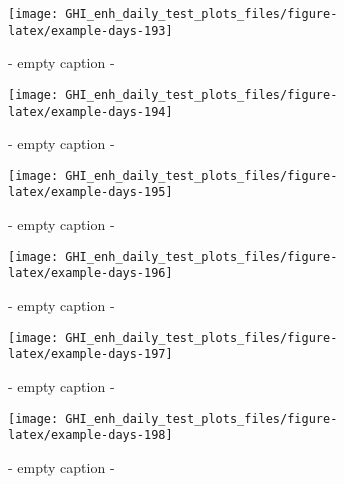 \documentclass[
  10pt,
  a4paper,oneside]{article}
\begin{document}
\begin{figure}[H]

{\centering \texttt{[image: GHI\_enh\_daily\_test\_plots\_files/figure-latex/example-days-193]} 

}

\caption{ - empty caption - }\label{fig:example-days-193}
\end{figure}

\begin{figure}[H]

{\centering \texttt{[image: GHI\_enh\_daily\_test\_plots\_files/figure-latex/example-days-194]} 

}

\caption{ - empty caption - }\label{fig:example-days-194}
\end{figure}

\begin{figure}[H]

{\centering \texttt{[image: GHI\_enh\_daily\_test\_plots\_files/figure-latex/example-days-195]} 

}

\caption{ - empty caption - }\label{fig:example-days-195}
\end{figure}

\begin{figure}[H]

{\centering \texttt{[image: GHI\_enh\_daily\_test\_plots\_files/figure-latex/example-days-196]} 

}

\caption{ - empty caption - }\label{fig:example-days-196}
\end{figure}

\begin{figure}[H]

{\centering \texttt{[image: GHI\_enh\_daily\_test\_plots\_files/figure-latex/example-days-197]} 

}

\caption{ - empty caption - }\label{fig:example-days-197}
\end{figure}

\begin{figure}[H]

{\centering \texttt{[image: GHI\_enh\_daily\_test\_plots\_files/figure-latex/example-days-198]} 

}

\caption{ - empty caption - }\label{fig:example-days-198}
\end{figure}
\end{document}
